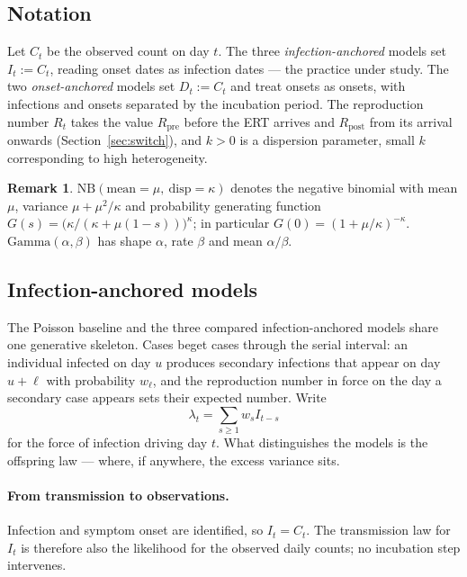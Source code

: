\documentclass[11pt,a4paper]{article}
\theoremstyle{plain}
\theoremstyle{definition}
\newtheorem*{remark}{Remark}
\newcommand{\Rpre}{R_{\mathrm{pre}}}
\newcommand{\Rpost}{R_{\mathrm{post}}}
\newcommand{\NB}{\mathrm{NB}}
\newcommand{\Gam}{\mathrm{Gamma}}
\begin{document}
\subsection{Notation}
\label{sec:notation}

Let $C_t$ be the observed count on day $t$. The three \emph{infection-anchored} models set
$I_t := C_t$, reading onset dates as infection dates --- the practice under study.
The two \emph{onset-anchored} models set $D_t := C_t$ and treat onsets as onsets, with
infections and onsets separated by the incubation period. The reproduction number $R_t$ takes
the value $\Rpre$ before the ERT arrives and $\Rpost$ from its arrival onwards
(Section~\ref{sec:switch}), and $k > 0$ is a dispersion parameter, small $k$ corresponding to
high heterogeneity.

\begin{remark}
$\NB(\text{mean}=\mu,\ \text{disp}=\kappa)$ denotes the negative binomial with mean $\mu$,
variance $\mu + \mu^2/\kappa$ and probability generating function
$G(s) = \bigl(\kappa/(\kappa+\mu(1-s))\bigr)^{\kappa}$; in particular
$G(0) = (1+\mu/\kappa)^{-\kappa}$. $\Gam(\alpha,\beta)$ has shape $\alpha$, rate $\beta$ and
mean $\alpha/\beta$.
\end{remark}

\subsection{Infection-anchored models}
\label{sec:naive-models}

The Poisson baseline and the three compared infection-anchored models share one generative
skeleton. Cases beget cases through the serial interval: an individual infected on day $u$
produces secondary infections that appear on day $u+\ell$ with probability $w_\ell$, and the
reproduction number in force on the day a secondary case appears sets their expected number.
Write
\begin{equation}
  \lambda_t = \sum_{s\ge 1} w_s I_{t-s}
  \label{eq:naive-foi}
\end{equation}
for the force of infection driving day $t$. What distinguishes the models is the offspring law
--- where, if anywhere, the excess variance sits.

\paragraph{From transmission to observations.} Infection and symptom onset are identified, so
$I_t=C_t$. The transmission law for $I_t$ is therefore also the likelihood for the observed
daily counts; no incubation step intervenes.
\end{document}
